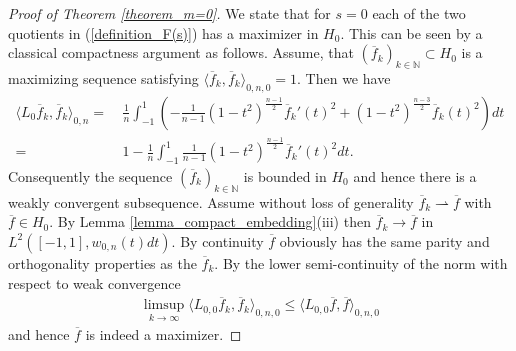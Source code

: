\documentclass[12pt,twoside]{amsart}
\numberwithin{satz}{section}
\theoremstyle{definition}
\numberwithin{equation}{section}
\newcommand\N{\mathbb{N}}
\begin{document}
\begin{proof}[Proof of Theorem \ref{theorem_m=0}]
		We state that for $s=0$ each of the two quotients in (\ref{definition_F(s)}) has a maximizer in $H_0$. This can be seen by a classical compactness argument as follows. Assume, that $(\overline{f}_k)_{k\in\N}\subset H_0$ is a maximizing sequence satisfying $\langle \overline{f}_k,\overline{f}_k\rangle_{0,n,0}=1$. Then we have
		\begin{align*}
			\langle L_0\overline{f}_k,\overline{f}_k\rangle_{0,n} =& \ \frac{1}{n}\int_{-1}^1 \left(-\frac{1}{n-1}(1-t^2)^{\frac{n-1}{2}}\overline{f}_k'(t)^2 + (1-t^2)^{\frac{n-3}{2}}\overline{f}_k(t)^2\right)dt  \\
			=& \ 1 -\frac{1}{n}\int_{-1}^1 \frac{1}{n-1}(1-t^2)^{\frac{n-1}{2}}\overline{f}_k'(t)^2 dt.
		\end{align*}
		Consequently the sequence $(\overline{f}_k)_{k\in\N}$ is bounded in $H_0$ and hence there is a weakly convergent subsequence. Assume without loss of generality $\overline{f}_k\rightharpoonup \overline{f}$ with $\overline{f}\in H_0$. By Lemma \ref{lemma_compact_embedding}(iii) then $\overline{f}_k\to\overline{f}$ in $L^2([-1,1],w_{0,n}(t)dt)$. By continuity $\overline{f}$ obviously has the same parity and orthogonality properties as the $\overline{f}_k$. By the lower semi-continuity of the norm with respect to weak convergence
		\begin{align*}
			\limsup\limits_{k\to\infty} \langle L_{0,0}\overline{f}_k,\overline{f}_k\rangle_{0,n,0} \leq \langle L_{0,0}\overline{f},\overline{f}\rangle_{0,n,0}
		\end{align*}
		and hence $\overline{f}$ is indeed a maximizer.
		

\end{proof}
\end{document}

